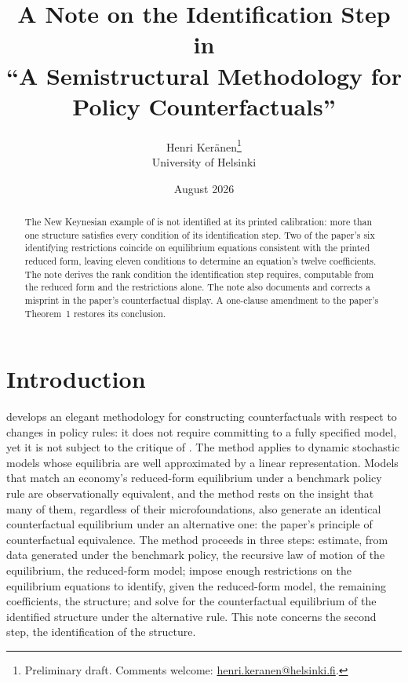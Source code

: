 \documentclass[11pt]{article}
\title{A Note on the Identification Step in\\
``A Semistructural Methodology for Policy Counterfactuals''}
\author{Henri Ker\"anen\thanks{Preliminary draft. Comments welcome: \href{mailto:henri.keranen@helsinki.fi}{henri.keranen@helsinki.fi}.}\\
\small University of Helsinki}
\date{August 2026}
\theoremstyle{remark}
\begin{document}
\maketitle

\begin{abstract}
\noindent The New Keynesian example of \citet{Beraja2023} is not identified at its printed calibration: more than one structure satisfies every condition of its identification step. Two of the paper's six identifying restrictions coincide on equilibrium equations consistent with the printed reduced form, leaving eleven conditions to determine an equation's twelve coefficients. The note derives the rank condition the identification step requires, computable from the reduced form and the restrictions alone. The note also documents and corrects a misprint in the paper's counterfactual display. A one-clause amendment to the paper's Theorem~1 restores its conclusion.
\end{abstract}

\section{Introduction}

\citet{Beraja2023} develops an elegant methodology for constructing counterfactuals with respect to changes in policy rules: it does not require committing to a fully specified model, yet it is not subject to the critique of \citet{Lucas1976}. The method applies to dynamic stochastic models whose equilibria are well approximated by a linear representation. Models that match an economy's reduced-form equilibrium under a benchmark policy rule are observationally equivalent, and the method rests on the insight that many of them, regardless of their microfoundations, also generate an identical counterfactual equilibrium under an alternative one: the paper's principle of counterfactual equivalence. The method proceeds in three steps: estimate, from data generated under the benchmark policy, the recursive law of motion of the equilibrium, the reduced-form model; impose enough restrictions on the equilibrium equations to identify, given the reduced-form model, the remaining coefficients, the structure; and solve for the counterfactual equilibrium of the identified structure under the alternative rule. This note concerns the second step, the identification of the structure.
\end{document}
